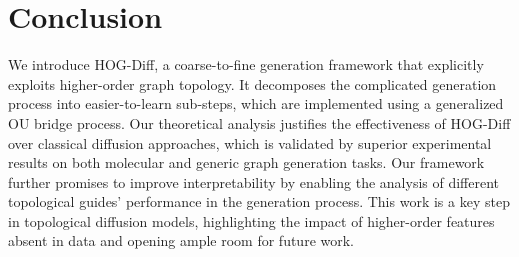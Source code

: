 \vspace{-3mm}
\section{Conclusion}
\vspace{-1.5mm}
We introduce HOG-Diff, a coarse-to-fine generation framework that explicitly exploits higher-order graph topology.
It decomposes the complicated generation process into easier-to-learn sub-steps, which are implemented using a generalized OU bridge process.
% 
Our theoretical analysis justifies the effectiveness of HOG-Diff over classical diffusion approaches, which is validated by superior experimental results on both molecular and generic graph generation tasks.
%
Our framework further promises to improve interpretability by enabling the analysis of different topological guides’ performance in the generation process.
%
This work is a key step in topological diffusion models, highlighting the impact of higher-order features absent in data and opening ample room for future work.


